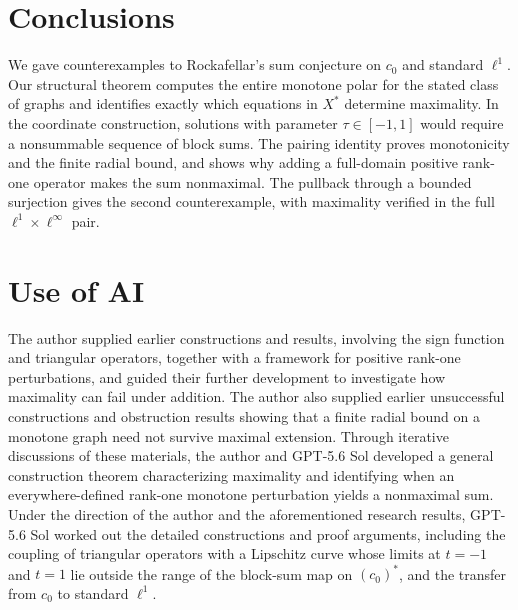 \documentclass[11pt]{article}
\theoremstyle{definition}
\theoremstyle{remark}
\begin{document}
\section{Conclusions}
\label{sec:conclusion}

We gave counterexamples to Rockafellar's sum conjecture on $c_0$ and standard $\ell^1$. Our structural theorem computes the entire monotone polar for the stated class of graphs and identifies exactly which equations in $X^*$ determine maximality. In the coordinate construction, solutions with parameter $\tau\in[-1,1]$ would require a nonsummable sequence of block sums. The pairing identity proves monotonicity and the finite radial bound, and shows why adding a full-domain positive rank-one operator makes the sum nonmaximal. The pullback through a bounded surjection gives the second counterexample, with maximality verified in the full $\ell^1\times\ell^\infty$ pair.


\section*{Use of AI}
The author supplied earlier constructions and results, involving the sign function and triangular operators, together with a framework for positive rank-one perturbations, and guided their further development to investigate how maximality can fail under addition. The author also supplied earlier unsuccessful constructions and obstruction results showing that a finite radial bound on a monotone graph need not survive maximal extension. Through iterative discussions of these materials, the author and GPT-5.6 Sol developed a general construction theorem characterizing maximality and identifying when an everywhere-defined rank-one monotone perturbation yields a nonmaximal sum.  Under the direction of the author and the aforementioned research results, GPT-5.6 Sol worked out the detailed constructions and proof arguments, including the coupling of triangular operators with a Lipschitz curve whose limits at $t=-1$ and $t=1$ lie outside the range of the block-sum map on $(c_0)^*$, and the transfer from $c_0$ to standard $\ell^1$. 






\begingroup
\raggedright 

\endgroup
\end{document}
